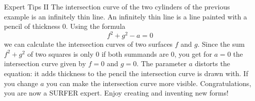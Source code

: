 \begin{surferPage}{Expert Tips II}
The intersection curve of the two cylinders of the previous example is an infinitely thin line. An infinitely thin line is a line painted with a pencil of thickness 0. Using the formula
\[ f^2+g^2-a=0\]
we can calculate the intersection curves of two surfaces $f$ and $g$. Since the sum $f^2+g^2$ of two squares is only $0$ if both summands are $0$, you get for $a=0$ the intersection curve given by $f=0$ and $g=0$.
 The parameter $a$ distorts the equation: it adds thickness to the pencil the intersection curve is drawn with. If you change $a$ you can make the intersection curve more visible.
\newline \newline
Congratulations, you are now a SURFER expert. Enjoy creating and inventing new forms!
\end{surferPage}
